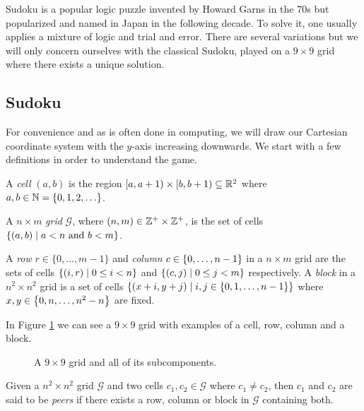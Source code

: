 Sudoku is a popular logic puzzle invented by Howard Garns in the 70s but popularized and named in Japan in the following decade\cite{bib:sudoku}. To solve it, one usually applies a mixture of logic and trial and error. There are several variations but we will only concern ourselves with the classical Sudoku, played on a $9 \times 9$ grid where there exists a unique solution.

\subsection{Sudoku}
For convenience and as is often done in computing, we will draw our Cartesian coordinate system with the $y$-axis increasing downwards. We start with a few definitions in order to understand the game.

\begin{definition}
A \emph{cell} $(a,b)$ is the region $[a,a+1) \times [b,b+1) \subseteq \mathbb{R}^2$ where $a,b\in\mathbb{N}=\left\{0,1,2,\ldots\right\}$.
\end{definition}

\begin{definition}
A $n\times m$ \emph{grid} $\mathcal{G}$, where $(n,m) \in \mathbb{Z}^+\times\mathbb{Z}^+$, is the set of cells $\left\{(a,b) \mid a < n \text{ and } b < m\right\}$.
\end{definition}

\begin{definition}
A \emph{row} $r \in \{0,\ldots,m-1\}$ and \emph{column} $c\in\left\{0,\ldots,n-1\right\}$ in a $n\times m$ grid are the sets of cells $\left\{(i,r) \mid 0 \leq i < n\right\}$ and $\left\{(c,j) \mid 0 \leq j < m\right\}$ respectively. A \emph{block} in a $n^2 \times n^2$ grid is a set of cells $\left\{(x+i, y+j) \mid i,j \in \left\{0,1,\ldots,n-1\right\}\right\}$ where $x,y\in\left\{0,n,\ldots,n^2-n\right\}$ are fixed.
\end{definition}
In Figure \ref{fig:grid} we can see a $9\times9$ grid with examples of a cell, row, column and a block.

\begin{center}
  \begin{figure}[ht]
    \centering
    \def\scale{.65} %
    
    \caption{A $9\times9$ grid and all of its subcomponents.}
    \label{fig:grid}
  \end{figure}
\end{center}

\begin{definition}
Given a $n^2 \times n^2$ grid $\mathcal{G}$ and two cells $c_1,c_2 \in \mathcal{G}$ where $c_1 \neq c_2$, then $c_1$ and $c_2$ are said to be \emph{peers} if there exists a row, column or block in $\mathcal{G}$ containing both.
\end{definition}

